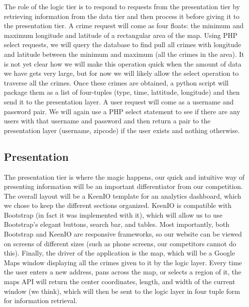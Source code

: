 \documentclass[paper=a4, fontsize=11pt]{scrartcl} %
\numberwithin{equation}{section} %
\numberwithin{figure}{section} %
\numberwithin{table}{section} %
\begin{document}
The role of the logic tier is to respond to requests from the presentation tier by retrieving information from the data tier and then process it before giving it to the presentation tier. A crime request will come as four floats: the minimum and maximum longitude and latitude of a rectangular area of the map. Using PHP select requests, we will query the database to find pull all crimes with longitude and latitude between the minimum and maximum (all the crimes in the area). It is not yet clear how we will make this operation quick when the amount of data we have gets very large, but for now we will likely allow the select operation to traverse all the crimes. Once these crimes are obtained, a python script will package them as a list of four-tuples (type, time, lattitude, longitude) and then send it to the presentation layer. A user request will come as a username and password pair. We will again use a PHP select statement to see if there are any users with that username and password and then return a pair to the presentation layer (username, zipcode) if the user exists and nothing otherwise. 


\subsection{Presentation}

The presentation tier is where the magic happens, our quick and intuitive way of presenting information will be an important differentiator from our competition. The overall layout will be a KeenIO template for an analytics dashboard, which we chose to keep the different sections organized. KeenIO is compatible with Bootstrap (in fact it was implemented with it), which will allow us to use Bootstrap's elegant buttons, search bar, and tables. Most importantly, both Bootstrap and KeenIO are responsive frameworks, so our website can be viewed on screens of different sizes (such as phone screens, our competitors cannot do this). Finally, the driver of the application is the map, which will be a Google Maps window displaying all the crimes given to it by the logic layer. Every time the user enters a new address, pans across the map, or selects a region of it, the maps API will return the center coordinates, length, and width of the current window (we think), which will then be sent to the logic layer in four tuple form for information retrieval.


\end{document}
